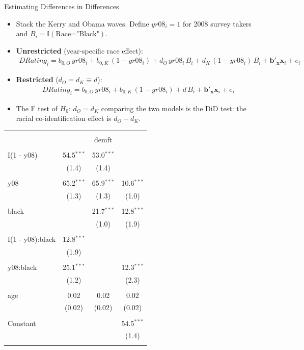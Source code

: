 \documentclass[aspectratio=169, handout]{beamer}
\numberwithin{equation}{section}
\begin{document}
\begin{frame}{Estimating Differences in Differences}
\begin{itemize}
\item Stack the Kerry and Obama waves. Define $yr08_i=1$ for 2008 survey takers and $B_i=\mathbb{I}(\text{Race="Black"})$.\pause
\item \textbf{Unrestricted} (year-specific race effect):
{\small
\begin{align*}
DRating_i=b_{0,O}\,yr08_i+b_{0,K}\,(1-yr08_i)+d_O\,yr08_i\,B_i+d_K\,(1-yr08_i)\,B_i+\bm{b'_x}\bm{x}_i+e_i
\end{align*}}\pause
\item \textbf{Restricted} ($d_O=d_K\equiv d$):
{\small
\begin{align*}
DRating_i=b_{0,O}\,yr08_i+b_{0,K}\,(1-yr08_i)+d\,B_i+\bm{b'_x}\bm{x}_i+e_i
\end{align*}}\pause
\item The F test of $H_0\!:\,d_O=d_K$ comparing the two models is the DiD test: the racial co-identification effect is $d_O-d_K$.
\end{itemize}
\end{frame}

\begin{frame}

\scriptsize{\begin{table}[!htbp] \centering 
\begin{tabular}{@{\extracolsep{5pt}}lccc} 
\\[-1.8ex]\hline 
\\[-1.8ex] & \multicolumn{3}{c}{demft} \\
\hline \\[-1.8ex] 
 I(1 - y08) & 54.5$^{***}$ & 53.0$^{***}$ &  \\ 
  & (1.4) & (1.4) &  \\ 
  & & & \\ 
y08 & 65.2$^{***}$ & 65.9$^{***}$ & 10.6$^{***}$ \\ 
  & (1.3) & (1.3) & (1.0) \\ 
  & & & \\ 
 black &  & 21.7$^{***}$ & 12.8$^{***}$ \\ 
  &  & (1.0) & (1.9) \\ 
  & & & \\ 
 I(1 - y08):black & 12.8$^{***}$ &  &  \\ 
  & (1.9) &  &  \\ 
  & & & \\ 
 y08:black & 25.1$^{***}$ &  & 12.3$^{***}$ \\ 
  & (1.2) &  & (2.3) \\ 
  & & & \\ 
   age & 0.02 & 0.02 & 0.02 \\ 
  & (0.02) & (0.02) & (0.02) \\ 
  & & & \\ 
 Constant &  &  & 54.5$^{***}$ \\ 
  &  &  & (1.4) \\ 
\hline 
\hline \\[-1.8ex] 
\end{tabular} 
\end{table} }
\end{frame}
\end{document}
